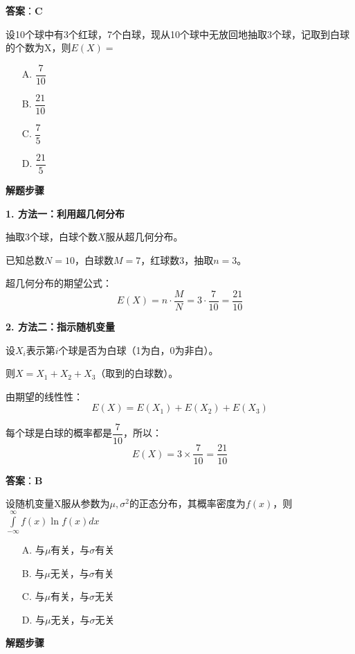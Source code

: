 \documentclass[standard]{ExBook}
\begin{document}
\begin{qitems}
\begin{bbox}
\begin{solution}
            \textbf{答案}：\textbf{C}
        \end{solution}
    \end{bbox}

    \begin{bbox}
        \qitem 设10个球中有3个红球，7个白球，现从10个球中无放回地抽取3个球，记取到白球的个数为X，则$E(X)=$
        \begin{itemize}
            \item[A.] $\dfrac{7}{10}$
            \item[B.] $\dfrac{21}{10}$
            \item[C.] $\dfrac{7}{5}$
            \item[D.] $\dfrac{21}{5}$
        \end{itemize}
        \begin{solution}
            \textbf{解题步骤}
            
            \textbf{1. 方法一：利用超几何分布}
            
            抽取3个球，白球个数$X$服从超几何分布。
            
            已知总数$N=10$，白球数$M=7$，红球数$3$，抽取$n=3$。
            
            超几何分布的期望公式：$$E(X) = n \cdot \frac{M}{N} = 3 \cdot \frac{7}{10} = \frac{21}{10}$$
            
            \textbf{2. 方法二：指示随机变量}
            
            设$X_i$表示第$i$个球是否为白球（1为白，0为非白）。
            
            则$X = X_1 + X_2 + X_3$（取到的白球数）。
            
            由期望的线性性：$$E(X) = E(X_1) + E(X_2) + E(X_3)$$
            
            每个球是白球的概率都是$\dfrac{7}{10}$，所以：
            $$E(X) = 3 \times \frac{7}{10} = \frac{21}{10}$$
            
            \textbf{答案}：\textbf{B}
        \end{solution}
    \end{bbox}

    \begin{bbox}
        \qitem 设随机变量X服从参数为$\mu, \sigma^2$的正态分布，其概率密度为$f(x)$，则$\int\limits_{-\infty}^{\infty} f(x) \ln f(x) dx$
        \begin{itemize}
            \item[A.] 与$\mu$有关，与$\sigma$有关
            \item[B.] 与$\mu$无关，与$\sigma$有关
            \item[C.] 与$\mu$有关，与$\sigma$无关
            \item[D.] 与$\mu$无关，与$\sigma$无关
        \end{itemize}
        \begin{solution}
            \textbf{解题步骤}
            

\end{solution}
\end{bbox}
\end{qitems}
\end{document}
